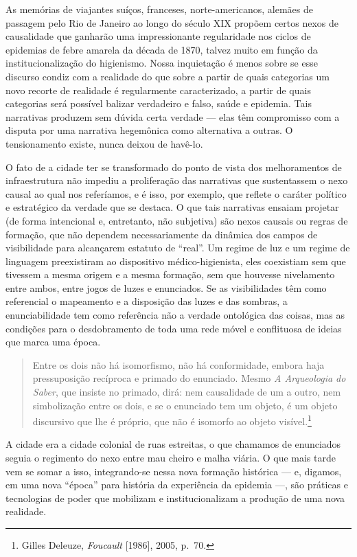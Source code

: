 As memórias de viajantes suíços, franceses, norte-americanos, alemães de
passagem pelo Rio de Janeiro ao longo do século XIX propõem certos nexos
de causalidade que ganharão uma impressionante regularidade nos ciclos
de epidemias de febre amarela da década de 1870, talvez muito em função
da institucionalização do higienismo. Nossa inquietação é menos sobre se
esse discurso condiz com a realidade do que sobre a partir de quais
categorias um novo recorte de realidade é regularmente caracterizado, a
partir de quais categorias será possível balizar verdadeiro e falso,
saúde e epidemia. Tais narrativas produzem sem dúvida certa verdade ---
elas têm compromisso com a disputa por uma narrativa hegemônica como
alternativa a outras. O tensionamento existe, nunca deixou de havê-lo.

O fato de a cidade ter se transformado do ponto de vista dos
melhoramentos de infraestrutura não impediu a proliferação das
narrativas que sustentassem o nexo causal ao qual nos referíamos, e é
isso, por exemplo, que reflete o caráter político e estratégico da
verdade que se destaca. O que tais narrativas ensaiam projetar (de forma
intencional e, entretanto, não subjetiva) são nexos causais ou regras de
formação, que não dependem necessariamente da dinâmica dos campos de
visibilidade para alcançarem estatuto de ``real''. Um regime de luz e um
regime de linguagem preexistiram ao dispositivo médico-higienista, eles
coexistiam sem que tivessem a mesma origem e a mesma formação, sem que
houvesse nivelamento entre ambos, entre jogos de luzes e enunciados. Se
as visibilidades têm como referencial o mapeamento e a disposição das
luzes e das sombras, a enunciabilidade tem como referência não a verdade
ontológica das coisas, mas as condições para o desdobramento de toda uma
rede móvel e conflituosa de ideias que marca uma época.

\begin{quote}
Entre os dois não há isomorfismo, não há conformidade, embora haja
pressuposição recíproca e primado do enunciado. Mesmo \textit{A
Arqueologia do Saber}, que insiste no primado, dirá: nem causalidade de
um a outro, nem simbolização entre os dois, e se o enunciado tem um
objeto, é um objeto discursivo que lhe é próprio, que não é isomorfo ao
objeto visível.\footnote{Gilles Deleuze, \textit{Foucault} {[}1986{]},
  2005, p.~70.}
\end{quote}

A cidade era a cidade colonial de ruas estreitas, o que chamamos de
enunciados seguia o regimento do nexo entre mau cheiro e malha viária. O
que mais tarde vem se somar a isso, integrando-se nessa nova formação
histórica --- e, digamos, em uma nova ``época'' para história da
experiência da epidemia ---, são práticas e tecnologias de poder que
mobilizam e institucionalizam a produção de uma nova realidade.

